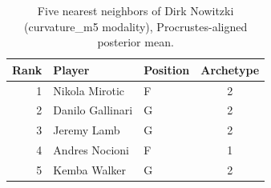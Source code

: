 \begin{table}[htbp]
  \centering\small
  \begin{tabular}{rllc}
    \toprule
    Rank & Player & Position & Archetype \\
    \midrule
    1 & Nikola Mirotic & F & 2 \\
    2 & Danilo Gallinari & G & 2 \\
    3 & Jeremy Lamb & G & 2 \\
    4 & Andres Nocioni & F & 1 \\
    5 & Kemba Walker & G & 2 \\
    \bottomrule
  \end{tabular}
  \caption{Five nearest neighbors of Dirk Nowitzki (curvature_m5 modality), Procrustes-aligned posterior mean.}
  \label{tab:Dirk_Nowitzki_neighbors_curvature_m5}
\end{table}

